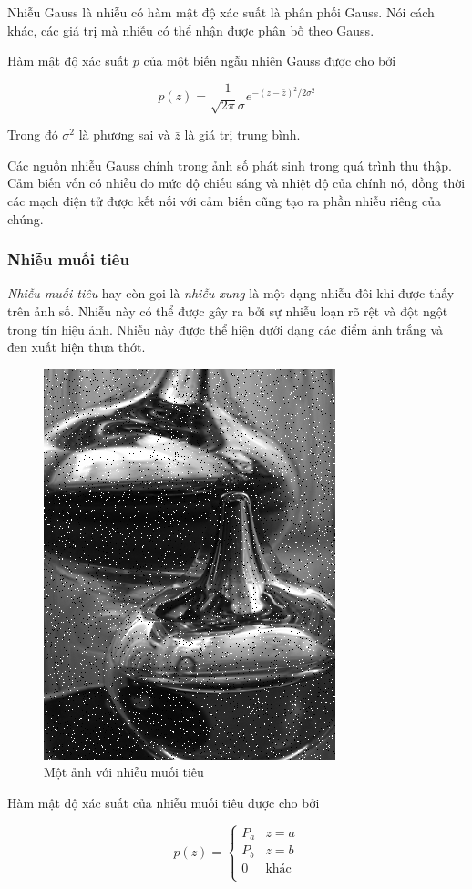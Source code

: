Nhiễu Gauss là nhiễu có hàm mật độ xác suất là phân phối Gauss. Nói cách khác, các giá trị mà nhiễu có thể nhận được phân bố theo Gauss.

Hàm mật độ xác suất $p$ của một biến ngẫu nhiên Gauss được cho bởi

$$p(z) = \frac{1}{\sqrt{2\pi} \sigma}e^{-(z-\bar{z})^2 / 2\sigma^2}$$

Trong đó $\sigma^2$ là phương sai và $\bar{z}$ là giá trị trung bình.

Các nguồn nhiễu Gauss chính trong ảnh số phát sinh trong quá trình thu thập. Cảm biến vốn có nhiễu do mức độ chiếu sáng và nhiệt độ của chính nó, đồng thời các mạch điện tử được kết nối với cảm biến cũng tạo ra phần nhiễu riêng của chúng.

\subsubsection{Nhiễu muối tiêu}

\textit{Nhiễu muối tiêu} hay còn gọi là \textit{nhiễu xung} là một dạng nhiễu đôi khi được thấy trên ảnh số. Nhiễu này có thể được gây ra bởi sự nhiễu loạn rõ rệt và đột ngột trong tín hiệu ảnh. Nhiễu này được thể hiện dưới dạng các điểm ảnh trắng và đen xuất hiện thưa thớt.

\begin{figure}[H]
    \centering
    \includegraphics[width=0.5\linewidth]{../images/salt_and_pepper_noise.png}
    \caption{Một ảnh với nhiễu muối tiêu}
    \label{fig:salt_and_pepper_noise}
\end{figure}

Hàm mật độ xác suất của nhiễu muối tiêu được cho bởi

$$p(z) = \left\{\begin{matrix}
P_a & z = a \\
P_b & z = b \\
0 & \text{khác} \\
\end{matrix}\right.$$

